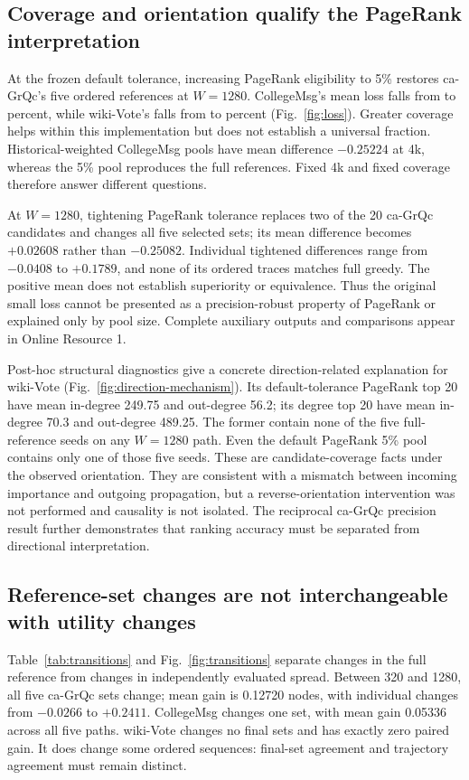 \documentclass[smallextended]{svjour3}
\begin{document}
\subsection{Coverage and orientation qualify the PageRank interpretation}
At the frozen default tolerance, increasing PageRank eligibility to 5\% restores ca-GrQc's five ordered references at $W=1280$. CollegeMsg's mean loss falls from \CollegePRLoss{} to \CollegePRfiveLoss{} percent, while wiki-Vote's falls from \WikiPRLoss{} to \WikiPRfiveLoss{} percent (Fig.~\ref{fig:loss}). Greater coverage helps within this implementation but does not establish a universal fraction. Historical-weighted CollegeMsg pools have mean difference $-0.25224$ at 4k, whereas the 5\% pool reproduces the full references. Fixed 4k and fixed coverage therefore answer different questions.

At $W=1280$, tightening PageRank tolerance replaces two of the 20 ca-GrQc candidates and changes all five selected sets; its mean difference becomes $+0.02608$ rather than $-0.25082$. Individual tightened differences range from $-0.0408$ to $+0.1789$, and none of its ordered traces matches full greedy. The positive mean does not establish superiority or equivalence. Thus the original small loss cannot be presented as a precision-robust property of PageRank or explained only by pool size. Complete auxiliary outputs and comparisons appear in Online Resource 1.

Post-hoc structural diagnostics give a concrete direction-related explanation for wiki-Vote (Fig.~\ref{fig:direction-mechanism}). Its default-tolerance PageRank top 20 have mean in-degree 249.75 and out-degree 56.2; its degree top 20 have mean in-degree 70.3 and out-degree 489.25. The former contain none of the five full-reference seeds on any $W=1280$ path. Even the default PageRank 5\% pool contains only one of those five seeds. These are candidate-coverage facts under the observed orientation. They are consistent with a mismatch between incoming importance and outgoing propagation, but a reverse-orientation intervention was not performed and causality is not isolated. The reciprocal ca-GrQc precision result further demonstrates that ranking accuracy must be separated from directional interpretation.

\subsection{Reference-set changes are not interchangeable with utility changes}
Table~\ref{tab:transitions} and Fig.~\ref{fig:transitions} separate changes in the full reference from changes in independently evaluated spread. Between 320 and 1280, all five ca-GrQc sets change; mean gain is 0.12720 nodes, with individual changes from $-0.0266$ to $+0.2411$. CollegeMsg changes one set, with mean gain 0.05336 across all five paths. wiki-Vote changes no final sets and has exactly zero paired gain. It does change some ordered sequences: final-set agreement and trajectory agreement must remain distinct.

\end{document}

